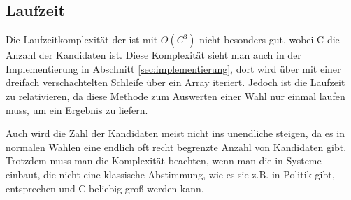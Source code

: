 

\subsection{Laufzeit}
\label{sec:Laufzeit}
Die Laufzeitkomplexität der \schulze ist mit $O(C^3)$ nicht besonders gut, wobei C die Anzahl der Kandidaten ist. Diese Komplexität sieht man auch in der Implementierung in Abschnitt \ref{sec:implementierung}, dort wird über mit einer dreifach verschachtelten Schleife über ein Array iteriert. Jedoch ist die Laufzeit zu relativieren, da diese Methode zum Auswerten einer Wahl nur einmal laufen muss, um ein Ergebnis zu liefern.

Auch wird die Zahl der Kandidaten meist nicht ins unendliche steigen, da es in normalen Wahlen eine endlich oft recht begrenzte Anzahl von Kandidaten gibt. Trotzdem muss man die Komplexität beachten, wenn man die \schulze in Systeme einbaut, die nicht eine klassische Abstimmung, wie es sie z.B. in Politik gibt, entsprechen und C beliebig groß werden kann.


